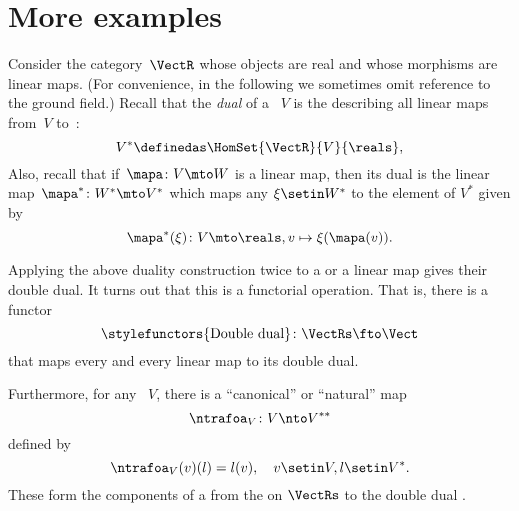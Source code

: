 \section{More examples}



\begin{example}
    \label{ex:Vect}
    Consider the category~$\VectR$ whose objects are real  and whose morphisms are linear maps.
    (For convenience, in the following we sometimes omit reference to the ground field.)
    Recall that the \emph{dual} of a ~$V$ is the  describing all linear maps from~$V$ to~\reals:
    \begin{equation}
        \label{eq:dual-vector-space}
        V^* \definedas \HomSet{\VectR}{V}{\reals},
    \end{equation}
    Also, recall that if~$\mapa\colon V \mto W$ is a linear map, then its dual is the linear map~$\mapa^* \linebreak[1] \colon W^* \mto V^*$ which maps any $\xi \setin W^*$ to the element of $V^*$ given by
    \begin{equation}
        \mapa^*(\xi) \colon V \mto \reals, v \mapsto \xi(\mapa(v)).
    \end{equation}

    Applying the above duality construction twice to a  or a linear map gives their double dual.
    It turns out that this is a functorial operation.
    That is, there is a functor
    \begin{equation}
        \label{eq:double-dual-functor}
        \text{\stylefunctors{Double dual}}\colon \VectRs \fto \Vect
    \end{equation}
    that maps every  and every linear map to its double dual.

    Furthermore, for any ~$V$, there is a ``canonical'' or ``natural'' map
    \begin{equation}
        \ntrafoa_V \colon V \nto V^{**}
    \end{equation}
    defined by
    \begin{equation}
        \label{eq:natural-trafo-to-double-dual}
        \ntrafoa_V(v)(l) = l(v), \quad v \setin V, l \setin V^*.
    \end{equation}
    These form the components of a  from the  on $\VectRs$ to the double dual .
\end{example}

